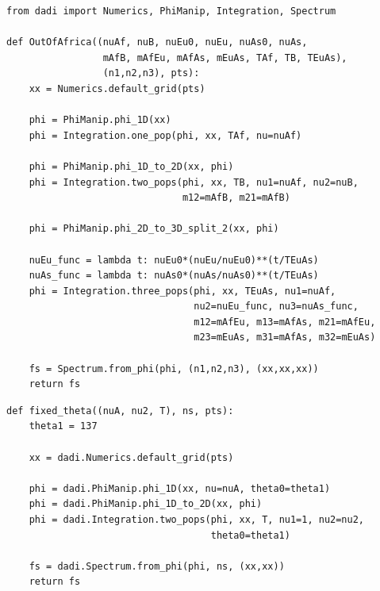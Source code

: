 \documentclass[12pt]{article}
\makeatletter
\newcommand{\py}[1]{\lstinline[language=Python, showstringspaces=False]@#1@}
\makeatother
\begin{document}
\begin{lstlisting}[caption={\textbf{Out-of-Africa model from Gutenkunst (2009):} This model involves a size change in the ancestral population, a split, another split, and then exponential growth of populations 1 and 2. (The \py{from dadi import} line imports those modules from the \py{dadi} namespace into the local namespace, so we don't have to type \py{dadi.} to access them.)}, float]
from dadi import Numerics, PhiManip, Integration, Spectrum

def OutOfAfrica((nuAf, nuB, nuEu0, nuEu, nuAs0, nuAs, 
                 mAfB, mAfEu, mAfAs, mEuAs, TAf, TB, TEuAs),
                 (n1,n2,n3), pts):
    xx = Numerics.default_grid(pts)

    phi = PhiManip.phi_1D(xx)
    phi = Integration.one_pop(phi, xx, TAf, nu=nuAf)

    phi = PhiManip.phi_1D_to_2D(xx, phi)
    phi = Integration.two_pops(phi, xx, TB, nu1=nuAf, nu2=nuB, 
                               m12=mAfB, m21=mAfB)

    phi = PhiManip.phi_2D_to_3D_split_2(xx, phi)

    nuEu_func = lambda t: nuEu0*(nuEu/nuEu0)**(t/TEuAs)
    nuAs_func = lambda t: nuAs0*(nuAs/nuAs0)**(t/TEuAs)
    phi = Integration.three_pops(phi, xx, TEuAs, nu1=nuAf, 
                                 nu2=nuEu_func, nu3=nuAs_func, 
                                 m12=mAfEu, m13=mAfAs, m21=mAfEu,
                                 m23=mEuAs, m31=mAfAs, m32=mEuAs)

    fs = Spectrum.from_phi(phi, (n1,n2,n3), (xx,xx,xx))
    return fs
\end{lstlisting}

\begin{lstlisting}[caption={\textbf{Fixed $\boldsymbol{\theta}$:} A split demographic model function with a fixed value of $\theta$=137 for derived population 1. The free parameters are the sizes of the ancestral pop, \py{nuA}, and derived pop 2, \py{nu2}, (relative to derived pop 1), along with the divergence time \py{T} between the two derived pops.}, label={lst:fixed_theta}, float]
def fixed_theta((nuA, nu2, T), ns, pts):
    theta1 = 137
    
    xx = dadi.Numerics.default_grid(pts)
    
    phi = dadi.PhiManip.phi_1D(xx, nu=nuA, theta0=theta1)
    phi = dadi.PhiManip.phi_1D_to_2D(xx, phi)
    phi = dadi.Integration.two_pops(phi, xx, T, nu1=1, nu2=nu2,
                                    theta0=theta1)
                                    
    fs = dadi.Spectrum.from_phi(phi, ns, (xx,xx))
    return fs
\end{lstlisting}
\end{document}
